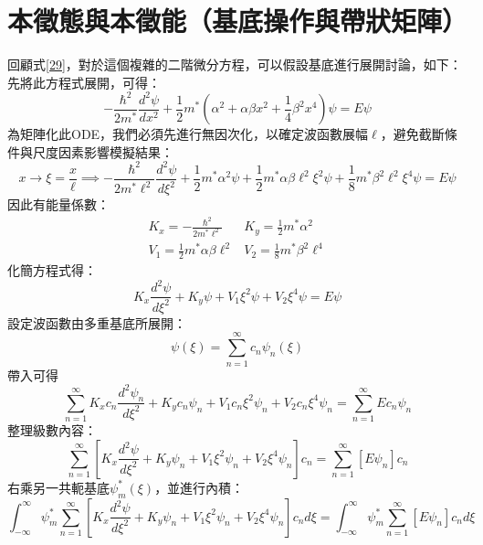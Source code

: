 \documentclass[12pt]{article}
\begin{document}
\section{本徵態與本徵能（基底操作與帶狀矩陣）}
回顧式\eqref{29}，對於這個複雜的二階微分方程，可以假設基底進行展開討論，如下：
\newline\noindent
先將此方程式展開，可得：
\begin{equation}
    -\frac{\hbar^2}{2m^*}\frac{d^2\psi}{dx^2}+\frac12m^*\left(\alpha^2+\alpha\beta x^2+\frac14\beta^2x^4\right)\psi=E\psi
\end{equation}
為矩陣化此ODE，我們必須先進行無因次化，以確定波函數展幅$\ell$，避免截斷條件與尺度因素影響模擬結果：
\begin{equation}
    x\to \xi=\frac{x}{\ell}\implies-\frac{\hbar^2}{2m^*\ell^2}\frac{d^2\psi}{d\xi^2}+\frac12m^*\alpha^2\psi+\frac12m^*\alpha\beta\ell^2\xi^2\psi+\frac18m^*\beta^2\ell^2\xi^4\psi=E\psi
\end{equation}
因此有能量係數：
\begin{equation}
    \begin{matrix}
        K_x=-\frac{\hbar^2}{2m^*\ell^2} & K_y=\frac12m^*\alpha^2 \\
        V_1=\frac12m^*\alpha\beta\ell^2 & V_2=\frac18m^*\beta^2\ell^4
    \end{matrix}
\end{equation}
化簡方程式得：
\begin{equation}
    K_x\frac{d^2\psi}{d\xi^2}+K_y\psi+V_1\xi^2\psi+V_2\xi^4\psi=E\psi
\end{equation}
設定波函數由多重基底所展開： 
\begin{equation}
    \psi(\xi)=\sum_{n=1}^{\infty}{c_n\psi_n(\xi)}
\end{equation}
帶入可得
\begin{equation}
    \sum_{n=1}^{\infty}{K_xc_n\frac{d^2\psi_n}{d\xi^2}+K_yc_n\psi_n+V_1c_n\xi^2\psi_n+V_2c_n\xi^4\psi_n}=\sum_{n=1}^{\infty}{Ec_n\psi_n}
\end{equation}
整理級數內容：
\begin{equation}
    \sum_{n=1}^{\infty}{\left[K_x\frac{d^2\psi}{d\xi^2}+K_y\psi_n+V_1\xi^2\psi_n+V_2\xi^4\psi_n\right]c_n}=\sum_{n=1}^{\infty}{\left[E\psi_n\right]c_n}
\end{equation}
右乘另一共軛基底$\psi_m^*(\xi)$，並進行內積：
\begin{equation}
    \int_{-\infty}^{\infty}{\psi_m^*\sum_{n=1}^{\infty}{\left[K_x\frac{d^2\psi}{d\xi^2}+K_y\psi_n+V_1\xi^2\psi_n+V_2\xi^4\psi_n\right]c_n}}d\xi=\int_{-\infty}^{\infty}{\psi_m^*\sum_{n=1}^{\infty}{\left[E\psi_n\right]c_n}}d\xi
\end{equation}
\end{document}
